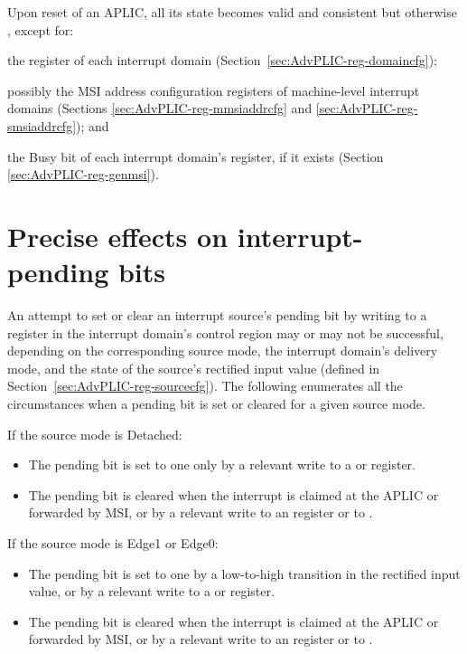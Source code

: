 Upon reset of an APLIC, all its state becomes
valid and consistent but otherwise {\unspecified}, except for:
\begin{tightList}

\item
the  register of each interrupt domain
(Section~\ref{sec:AdvPLIC-reg-domaincfg});

\item
possibly the MSI address configuration registers of machine-level
interrupt domains (Sections \ref{sec:AdvPLIC-reg-mmsiaddrcfg}
and \ref{sec:AdvPLIC-reg-smsiaddrcfg}); and

\item
the Busy bit of each interrupt domain's  register,
if it exists (Section \ref{sec:AdvPLIC-reg-genmsi}).

\end{tightList}

\section{Precise effects on interrupt-pending bits}
\label{sec:AdvPLIC-pendingBits}

An attempt to set or clear an interrupt source's pending bit by
writing to a register in the interrupt domain's control region
may or may not be successful, depending on the corresponding
source mode, the interrupt domain's delivery mode, and the
state of the source's rectified input value (defined in
Section~\ref{sec:AdvPLIC-reg-sourcecfg}).
The following enumerates all the circumstances when a pending bit is
set or cleared for a given source mode.

If the source mode is Detached:\nopagebreak
\begin{itemize}

\item
The pending bit is set to one only by a relevant write to a 
or  register.

\item
The pending bit is cleared when the interrupt is claimed at the APLIC or
forwarded by MSI, or by a relevant write to an  register
or to .

\end{itemize}

If the source mode is Edge1 or Edge0:
\begin{itemize}

\item
The pending bit is set to one by a low-to-high transition in the
rectified input value, or by a relevant write to a  or
 register.

\item
The pending bit is cleared when the interrupt is claimed at the APLIC or
forwarded by MSI, or by a relevant write to an  register
or to .

\end{itemize}

